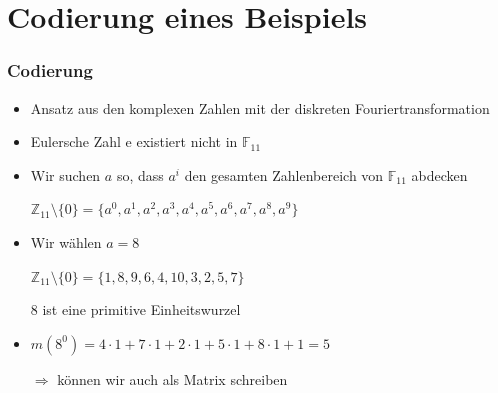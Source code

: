 \documentclass[11pt,aspectratio=169]{beamer}
\begin{document}
\section{Codierung eines Beispiels}
	\begin{frame}
		\frametitle{Codierung}
		
		\begin{itemize}
			\item Ansatz aus den komplexen Zahlen mit der diskreten Fouriertransformation
			
			\vspace{10pt}
			
			\item Eulersche Zahl $\mathrm{e}$ existiert nicht in $\mathbb{F}_{11}$
			
			\vspace{10pt}
			
			\item Wir suchen $a$ so, dass $a^i$ den gesamten Zahlenbereich von $\mathbb{F}_{11}$ abdecken
			
			$\mathbb{Z}_{11}\setminus\{0\} = \{a^0, a^1, a^2, a^3, a^4, a^5, a^6, a^7, a^8, a^9\}$
			
			\vspace{10pt}
			
			\item Wir wählen $a = 8$
			
			$\mathbb{Z}_{11}\setminus\{0\} = \{1,8,9,6,4,10,3,2,5,7\}$
			
			$8$ ist eine primitive Einheitswurzel
			
			\vspace{10pt}
			
			\item $m(8^0) = 4\cdot1 + 7\cdot1 + 2\cdot1 + 5\cdot1 + 8\cdot1 + 1 = 5$
			
			$\Rightarrow$ \qquad können wir auch als Matrix schreiben
			
		\end{itemize}
		
	\end{frame}
\end{document}
